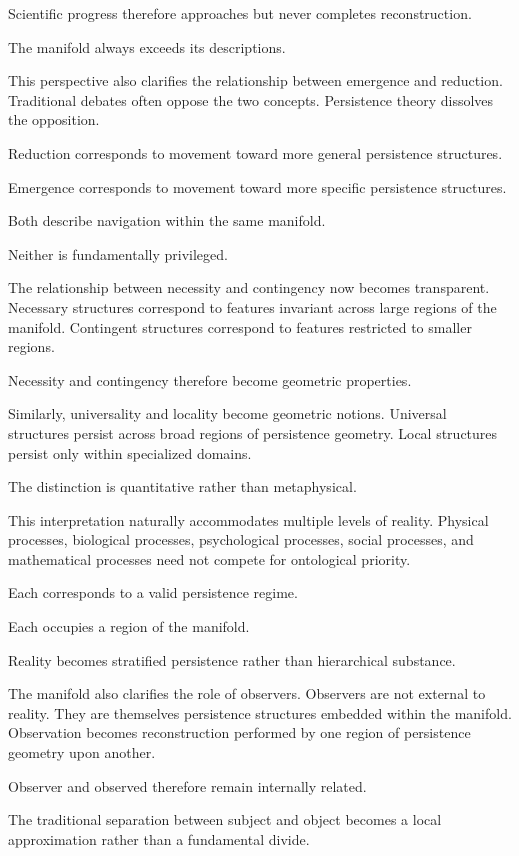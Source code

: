 \documentclass[12pt,oneside]{article}
\theoremstyle{definition}
\begin{document}
Scientific progress therefore approaches but never completes reconstruction.

The manifold always exceeds its descriptions.

This perspective also clarifies the relationship between emergence and reduction. Traditional debates often oppose the two concepts. Persistence theory dissolves the opposition.

Reduction corresponds to movement toward more general persistence structures.

Emergence corresponds to movement toward more specific persistence structures.

Both describe navigation within the same manifold.

Neither is fundamentally privileged.

The relationship between necessity and contingency now becomes transparent. Necessary structures correspond to features invariant across large regions of the manifold. Contingent structures correspond to features restricted to smaller regions.

Necessity and contingency therefore become geometric properties.

Similarly, universality and locality become geometric notions. Universal structures persist across broad regions of persistence geometry. Local structures persist only within specialized domains.

The distinction is quantitative rather than metaphysical.

This interpretation naturally accommodates multiple levels of reality. Physical processes, biological processes, psychological processes, social processes, and mathematical processes need not compete for ontological priority.

Each corresponds to a valid persistence regime.

Each occupies a region of the manifold.

Reality becomes stratified persistence rather than hierarchical substance.

The manifold also clarifies the role of observers. Observers are not external to reality. They are themselves persistence structures embedded within the manifold. Observation becomes reconstruction performed by one region of persistence geometry upon another.

Observer and observed therefore remain internally related.

The traditional separation between subject and object becomes a local approximation rather than a fundamental divide.
\end{document}
